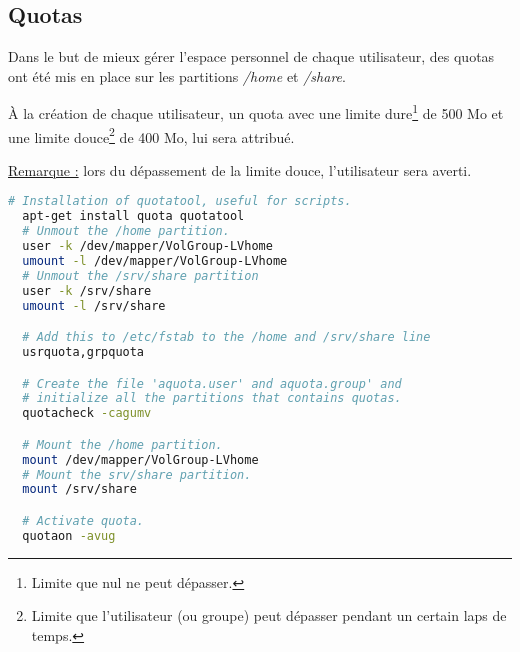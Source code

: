 \subsection{Quotas}
\label{subsec:quotas}

Dans le but de mieux gérer l'espace personnel de chaque utilisateur, des quotas
ont été mis en place sur les partitions \textit{/home} et \textit{/share}.

À la création de chaque utilisateur, un quota avec une limite
dure\footnote{Limite que nul ne peut dépasser.} de 500 Mo et une limite
douce\footnote{Limite que l'utilisateur (ou groupe) peut dépasser pendant un
certain laps de temps.} de 400 Mo, lui sera attribué.

\underline{Remarque :} lors du dépassement de la limite douce, l'utilisateur
sera averti.

\begin{lstlisting}[language=bash]
  # Installation of quotatool, useful for scripts.
  apt-get install quota quotatool
  # Unmout the /home partition.
  user -k /dev/mapper/VolGroup-LVhome
  umount -l /dev/mapper/VolGroup-LVhome
  # Unmout the /srv/share partition
  user -k /srv/share
  umount -l /srv/share

  # Add this to /etc/fstab to the /home and /srv/share line
  usrquota,grpquota

  # Create the file 'aquota.user' and aquota.group' and
  # initialize all the partitions that contains quotas.
  quotacheck -cagumv

  # Mount the /home partition.
  mount /dev/mapper/VolGroup-LVhome
  # Mount the srv/share partition.
  mount /srv/share

  # Activate quota.
  quotaon -avug
\end{lstlisting}

